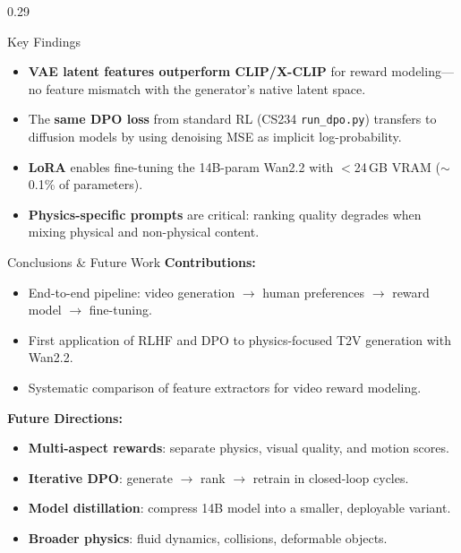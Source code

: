 \documentclass[final]{beamer}
\begin{document}
\begin{frame}[t,plain]
\begin{minipage}[t][0.98\textheight]{\textwidth}
\begin{columns}[t,onlytextwidth]
\begin{column}{0.29\textwidth}
  \vspace{0.08cm}

  \begin{block}{Key Findings}
    \begin{itemize}
      \item \textbf{VAE latent features outperform CLIP/X-CLIP}
            for reward modeling---no feature mismatch with the
            generator's native latent space.
      \item The \textbf{same DPO loss} from standard RL
            (CS234 \texttt{run\_dpo.py}) transfers to diffusion
            models by using denoising MSE as implicit
            log-probability.
      \item \textbf{LoRA} enables fine-tuning the 14B-param Wan2.2
            with $<$24\,GB VRAM ($\sim$0.1\% of parameters).
      \item \textbf{Physics-specific prompts} are critical:
            ranking quality degrades when mixing physical and
            non-physical content.
    \end{itemize}
  \end{block}

  \vspace{0.08cm}

  \begin{block}{Conclusions \& Future Work}
    \textbf{Contributions:}
    \begin{itemize}
      \item End-to-end pipeline: video generation $\to$
            human preferences $\to$ reward model $\to$ fine-tuning.
      \item First application of RLHF and DPO to physics-focused
            T2V generation with Wan2.2.
      \item Systematic comparison of feature extractors for
            video reward modeling.
    \end{itemize}

    \vspace{0.15cm}
    \textbf{Future Directions:}
    \begin{itemize}
      \item \textbf{Multi-aspect rewards}: separate physics,
            visual quality, and motion scores.
      \item \textbf{Iterative DPO}: generate $\to$ rank $\to$
            retrain in closed-loop cycles.
      \item \textbf{Model distillation}: compress 14B model
            into a smaller, deployable variant.
      \item \textbf{Broader physics}: fluid dynamics,
            collisions, deformable objects.
    \end{itemize}
  \end{block}


\end{column}
\end{columns}
\end{minipage}
\end{frame}
\end{document}
